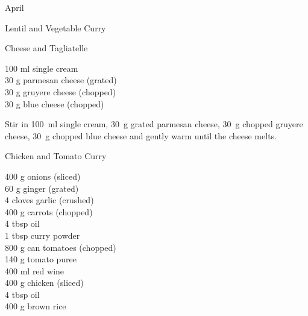 \begin{menu}{April}
\begin{recipe}{2}{Lentil and Vegetable Curry}
\begin{instructions}
    \end{instructions}
    \end{recipe}%
  
    \begin{recipe}{1}{Cheese and Tagliatelle}%
		\begin{ingredients}
		100 ml single cream  \\
	30 g parmesan cheese (grated) \\
	30 g gruyere cheese (chopped) \\
	30 g blue cheese (chopped) \\
	
		\end{ingredients}
	
	
	
    \begin{instructions}
    \item \item 
        Stir in
        100~ml  single cream,
        30~g grated parmesan cheese,
        30~g chopped gruyere cheese,
        30~g chopped blue cheese
        and gently warm until the cheese melts.
      
    \end{instructions}
    \end{recipe}%
  
    \begin{recipe}{2}{Chicken and Tomato Curry}%
		\begin{ingredients}
		400 g onions (sliced) \\
	60 g ginger (grated) \\
	4 cloves garlic (crushed) \\
	400 g carrots (chopped) \\
	4 tbsp oil  \\
	1 tbsp curry powder  \\
	800 g can tomatoes (chopped) \\
	140 g tomato puree  \\
	400 ml red wine  \\
	400 g chicken (sliced) \\
	4 tbsp oil  \\
	400 g brown rice  \\
	
		\end{ingredients}
	
	

\end{recipe}
\end{menu}

